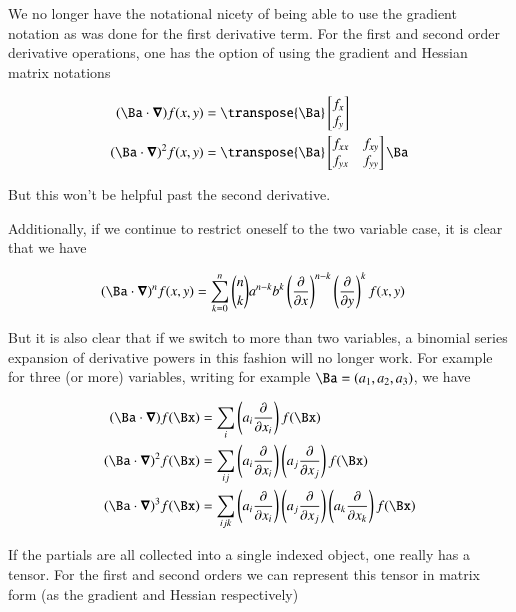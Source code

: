 We no longer have the notational nicety of being able to use the gradient notation as was done for the first derivative term.  For the 
first and second order derivative operations, one has the
option of using the gradient and Hessian matrix notations

\begin{align}
(\Ba \cdot \spacegrad) f(x,y) &=
\transpose{\Ba} 
\begin{bmatrix}
f_{x} \\
f_{y} 
\end{bmatrix} 
\\
(\Ba \cdot \spacegrad)^2 f(x,y) 
&=
\transpose{\Ba} 
\begin{bmatrix}
f_{xx} & f_{xy} \\
f_{yx} & f_{yy}
\end{bmatrix}
\Ba
\end{align}

But this won't be helpful past the second derivative.

Additionally, if we continue to restrict oneself to the two variable case, 
it is clear that we have

\begin{align}
(\Ba \cdot \spacegrad)^n f(x,y) 
&=
\sum_{k=0}^{n} \binom{n}{k} a^{n-k} b^{k} 
\left( \PD{x}{} \right)^{n-k}
\left( \PD{y}{} \right)^{k} f(x,y)
\end{align}

But it is also clear that if we switch to more than two variables, a binomial 
series expansion of derivative powers in this fashion will no longer work.  For
example for three (or more) variables, writing for example $\Ba = (a_1, a_2, a_3)$,
we have

\begin{align}
(\Ba \cdot \spacegrad) f(\Bx)
&=
\sum_{i} 
\left( a_i \PD{x_i}{} \right)
f(\Bx) \\
(\Ba \cdot \spacegrad)^2 f(\Bx) 
&=
\sum_{ij} 
\left( a_i \PD{x_i}{} \right)
\left( a_j \PD{x_j}{} \right)
f(\Bx) \\
(\Ba \cdot \spacegrad)^3 f(\Bx) 
&=
\sum_{ijk} 
\left( a_i \PD{x_i}{} \right)
\left( a_j \PD{x_j}{} \right)
\left( a_k \PD{x_k}{} \right)
f(\Bx) 
\end{align}

If the partials are all collected into a single indexed object, one really has a tensor.  For the first and second orders we
can represent this tensor in matrix form (as the gradient and Hessian respectively)

